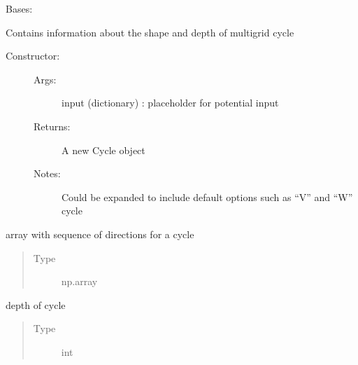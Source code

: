 \documentclass[letterpaper,10pt,english]{sphinxmanual}
\begin{document}
\begin{fulllineitems}
\label{\detokenize{autoapi/Cycle/index:Cycle.Cycle}}
\sphinxAtStartPar
Bases: 

\sphinxAtStartPar
Contains information about the shape and depth of multigrid cycle
\begin{description}
\item[{Constructor:}] \leavevmode\begin{description}
\item[{Args:}] \leavevmode
\sphinxAtStartPar
input (dictionary) : placeholder for potential input

\item[{Returns:}] \leavevmode
\sphinxAtStartPar
A new Cycle object

\item[{Notes:}] \leavevmode
\sphinxAtStartPar
Could be expanded to include default options such as “V” and “W” cycle

\end{description}

\end{description}

\begin{fulllineitems}
\label{\detokenize{autoapi/Cycle/index:Cycle.Cycle.pattern}}
\sphinxAtStartPar
array with sequence of directions for a cycle
\begin{quote}\begin{description}
\item[{Type}] \leavevmode
\sphinxAtStartPar
np.array

\end{description}\end{quote}

\end{fulllineitems}


\begin{fulllineitems}
\label{\detokenize{autoapi/Cycle/index:Cycle.Cycle.levels}}
\sphinxAtStartPar
depth of cycle
\begin{quote}\begin{description}
\item[{Type}] \leavevmode
\sphinxAtStartPar
int


\end{description}
\end{quote}
\end{fulllineitems}
\end{fulllineitems}
\end{document}
